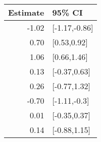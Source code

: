 \begin{tabular}{rl}
  \hline
Estimate & 95\% CI \\ 
  \hline
-1.02 & [-1.17,-0.86] \\ 
  0.70 & [0.53,0.92] \\ 
  1.06 & [0.66,1.46] \\ 
  0.13 & [-0.37,0.63] \\ 
  0.26 & [-0.77,1.32] \\ 
  -0.70 & [-1.11,-0.3] \\ 
  0.01 & [-0.35,0.37] \\ 
  0.14 & [-0.88,1.15] \\ 
   \hline
\end{tabular}

